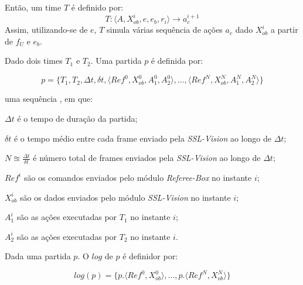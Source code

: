 \begin{defi}[Time]
\begin{description}
  \end{description}

  Então, um time $T$ é definido por:
  \[
    T: \langle A, X_{ob}^{i}, e, e_b, r_i \rangle \longrightarrow a_c^{i+1}
  \]
  Assim, utilizando-se de $e$, $T$ simula várias sequência de ações $a_c$ dado $X_{ob}^{i}$
  a partir de $f_{U}$ e $e_b$.
\end{defi}

\begin{defi}[Partida]
  Dado dois times $T_1$ e $T_2$. Uma partida $p$ é definida por:

  \[
   p = \lbrace T_1, T_2, \Delta t, \delta t, \langle Ref^{0}, X_{ob}^{0}, A_1^{0}, A_2^{0}\rangle, 
    ..., \langle Ref^{N}, X_{ob}^{N}, A_1^{N}, A_2^{N} \rangle \rbrace
 \]

  uma sequência , em que:
  \begin{description}
    \item $\Delta t$ é o tempo de duração da partida;
    \item $\delta t$ é o tempo médio entre cada frame enviado pela \textit{SSL-Vision} ao longo de $\Delta t$;
    \item $N \approxeq \frac{\Delta t}{\delta t}$ é número total de frames enviados pela \textit{SSL-Vision}
  ao longo de $\Delta t$;
    \item $Ref^{i}$ são os comandos enviados pelo módulo \textit{Referee-Box} no instante $i$;
    \item $X_{ob}^{i}$ são os dados enviados pelo módulo \textit{SSL-Vision} no instante $i$;
    \item $A_1^{i}$ são as ações executadas por $T_1$ no instante $i$;
    \item $A_2^{i}$ são as ações executadas por $T_2$ no instante $i$.
  \end{description}
\end{defi}

\begin{defi}[Logs]
  Dada uma partida $p$. O $log$ de $p$ é definidor por:

  \[
    log(p) = \lbrace p.\langle Ref^{0}, X_{ob}^{0}\rangle, ..., p.\langle Ref^{N}, X_{ob}^{N}\rangle \rbrace
  \]
\end{defi}
